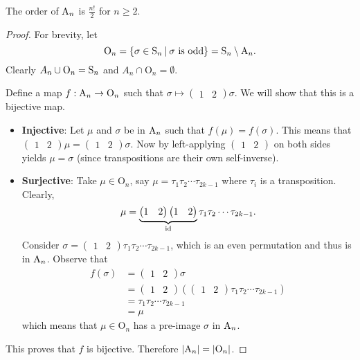\begin{proposition}\label{prop-order-of-An}
    The order of $\mathrm{A}_{n}$ is $\frac{n!}{2}$ for $n \geq 2$.
\end{proposition}
\begin{proof}
    For brevity, let
    \[
        \mathrm{O}_n = \left\{\sigma \in \Sn{n} \vert \sigma \text{ is odd}\right\} = \Sn{n} \setminus \An{n}.
    \]
    Clearly $A_n \cup \mathrm{O}_n = \mathrm{S}_{n}$ and $A_n \cap \mathrm{O}_n = \emptyset$.

    Define a map $f: \mathrm{A}_{n} \to \mathrm{O}_n$ such that $\sigma \mapsto \begin{pmatrix}1 & 2\end{pmatrix}\sigma$. We will show that this is a bijective map.
    \begin{itemize}
        \item \textbf{Injective}: Let $\mu$ and $\sigma$ be in $\mathrm{A}_{n}$ such that $f(\mu) = f(\sigma)$. This means that $\begin{pmatrix}1 & 2\end{pmatrix}\mu = \begin{pmatrix}1 & 2\end{pmatrix}\sigma$. Now by left-applying $\begin{pmatrix}1 & 2\end{pmatrix}$ on both sides yields $\mu = \sigma$ (since transpositions are their own self-inverse).
        
        \item \textbf{Surjective}: Take $\mu \in \mathrm{O}_n$, say $\mu = \tau_1\tau_2\cdots\tau_{2k-1}$ where $\tau_i$ is a transposition. Clearly,
        \[
            \mu = \underbrace{\begin{pmatrix}1 & 2\end{pmatrix}\begin{pmatrix}1 & 2\end{pmatrix}}_{\mathrm{id}}\tau_1\tau_2\cdots\tau_{2k-1}.
        \]
        Consider $\sigma = \begin{pmatrix}1 & 2\end{pmatrix}\tau_1\tau_2\cdots\tau_{2k-1}$, which is an even permutation and thus is in $\mathrm{A}_{n}$. Observe that
        \begin{align*}
            f(\sigma) &= \begin{pmatrix}1 & 2\end{pmatrix}\sigma\\
            &= \begin{pmatrix}1 & 2\end{pmatrix}\left(\begin{pmatrix}1 & 2\end{pmatrix}\tau_1\tau_2\cdots\tau_{2k-1}\right)\\
            &= \tau_1\tau_2\cdots\tau_{2k-1}\\
            &= \mu
        \end{align*}
        which means that $\mu \in \mathrm{O}_n$ has a pre-image $\sigma$ in $\mathrm{A}_{n}$.
    \end{itemize}
    This proves that $f$ is bijective. Therefore $|\mathrm{A}_{n}| = |\mathrm{O}_n|$.
    

\end{proof}
